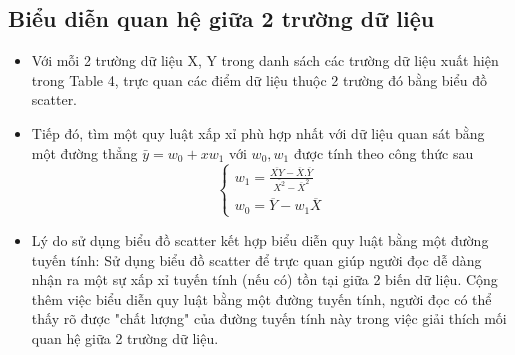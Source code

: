 \documentclass[a4paper, 12pt]{article}
\begin{document}
    \subsection{Biểu diễn quan hệ giữa 2 trường dữ liệu}

    \begin{itemize}
        \item Với mỗi 2 trường dữ liệu X, Y trong danh sách các trường dữ liệu xuất hiện trong Table 4, trực quan các điểm dữ liệu thuộc 2 trường đó bằng biểu đồ scatter.
        \item Tiếp đó, tìm một quy luật xấp xỉ phù hợp nhất với dữ liệu quan sát bằng một đường thẳng $\bar{y} = w_0 + xw_1$ với $w_0, w_1$ được tính theo công thức sau
        \begin{equation}
            \left\{\begin{matrix}
                w_1 = \frac{\overline{XY} - \overline{X}.\overline{Y}}{\overline{X^2}-\overline{X}^2}\\w_0 = \overline{Y} - w_1\overline{X}
            \end{matrix}\right.
        \end{equation}

        \item Lý do sử dụng biểu đồ scatter kết hợp biểu diễn quy luật bằng một đường tuyến tính: Sử dụng biểu đồ scatter để trực quan giúp người đọc dễ dàng nhận ra một sự xấp xỉ tuyến tính (nếu có) tồn tại giữa 2 biến dữ liệu. Cộng thêm việc biểu diễn quy luật bằng một đường tuyến tính, người đọc có thể thấy rõ được "chất lượng" của đường tuyến tính này trong việc giải thích mối quan hệ giữa 2 trường dữ liệu.


\end{itemize}
\end{document}
